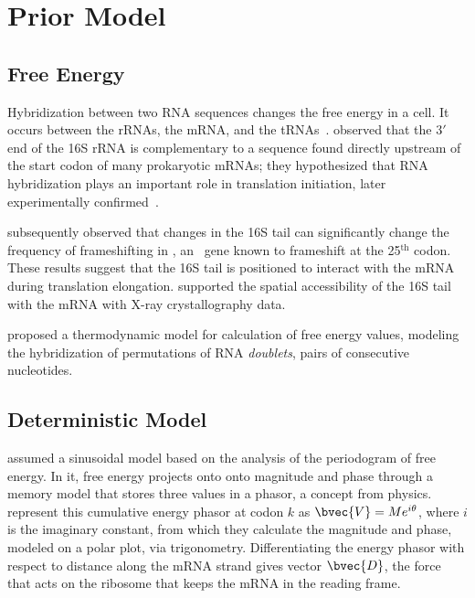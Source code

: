 \documentclass[12pt]{article}
\begin{document}
\section{Prior Model}
\subsection{Free Energy}
\label{freeenergy}

Hybridization between two RNA sequences changes the free energy in a cell.
It occurs between the rRNAs, the mRNA, and the tRNAs~\cite{starmer}.
\citet{sd} observed that the $3'$ end of the 16S rRNA is complementary to a sequence found 
directly upstream of the start codon of many prokaryotic mRNAs; they hypothesized that RNA hybridization 
plays an important role in translation initiation, later
experimentally confirmed~\cite{hui,jacob}.

\citet{weiss87} subsequently observed that changes in the 16S tail can 
significantly change the frequency of frameshifting in \prfB, an \ecoli\ gene 
known to frameshift at the 25$^\textrm{th}$ codon.  These results suggest that 
the 16S tail is positioned to interact with the mRNA during translation elongation. 
\citet{xray} supported the spatial accessibility of the 16S tail with the mRNA with 
X-ray crystallography data.

\citet{freier} proposed a thermodynamic model for calculation of free energy values,
modeling the hybridization of permutations of RNA \emph{doublets}, pairs of consecutive nucleotides.

\subsection{Deterministic Model}
\citet{lalit:mechanics} assumed a sinusoidal model 
based on the analysis of the periodogram of free energy. In it,
free energy projects onto onto magnitude and
phase through a memory model that stores three values
in a phasor, a concept from physics. 
\citeauthor{lalit:mechanics} represent this cumulative energy phasor
at codon $k$ as $\bvec{V} = Me^{i\theta}$, where $i$ is the imaginary
constant, from which they calculate the magnitude and phase, modeled
on a polar plot, via
trigonometry. Differentiating the energy phasor
with respect to distance along the mRNA strand gives 
vector $\bvec{D}$, the force~\cite{lalit:mechanics}
that acts on the ribosome that keeps the mRNA in the reading frame.
 
\end{document}
